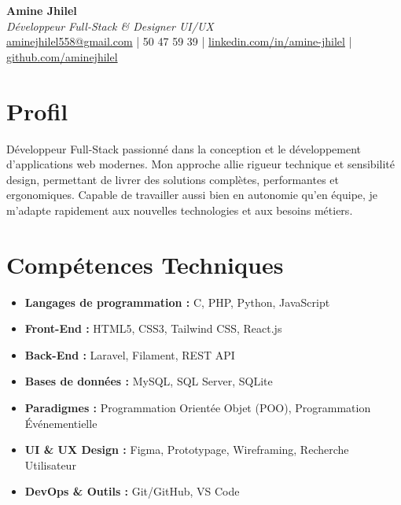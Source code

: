 \documentclass[11pt,a4paper,sans]{article}
\begin{document}
\begin{center}
    {\Huge \textbf{Amine Jhilel}}\\[0.2cm]
    {\large \textit{\color{primary}Développeur Full-Stack \& Designer UI/UX}}\\[0.2cm]
    \small
    \href{mailto:aminejhilel558@gmail.com}{aminejhilel558@gmail.com}
    \quad\textcolor{primary}{|} 50 47 59 39
    \quad\textcolor{primary}{|}\quad
    \href{https://linkedin.com/in/aminejhilel}{linkedin.com/in/amine-jhilel}
    \quad\textcolor{primary}{|}\quad
    \href{https://github.com/aminejhilel}{github.com/aminejhilel}
\end{center}

\section*{Profil}
Développeur Full-Stack passionné dans la conception et le développement d'applications web modernes. Mon approche allie rigueur technique et sensibilité design, permettant de livrer des solutions complètes, performantes et ergonomiques. Capable de travailler aussi bien en autonomie qu'en équipe, je m'adapte rapidement aux nouvelles technologies et aux besoins métiers.

\section*{Compétences Techniques}
\begin{itemize}[leftmargin=0.5cm, itemsep=1pt]
    \item \textbf{Langages de programmation :} C, PHP, Python, JavaScript
    \item \textbf{Front-End :} HTML5, CSS3, Tailwind CSS, React.js
    \item \textbf{Back-End :} Laravel, Filament, REST API
    \item \textbf{Bases de données :} MySQL, SQL Server, SQLite
    \item \textbf{Paradigmes :} Programmation Orientée Objet (POO), Programmation Événementielle
    \item \textbf{UI \& UX Design :} Figma, Prototypage, Wireframing, Recherche Utilisateur
    \item \textbf{DevOps \& Outils :} Git/GitHub, VS Code
\end{itemize}
\end{document}
